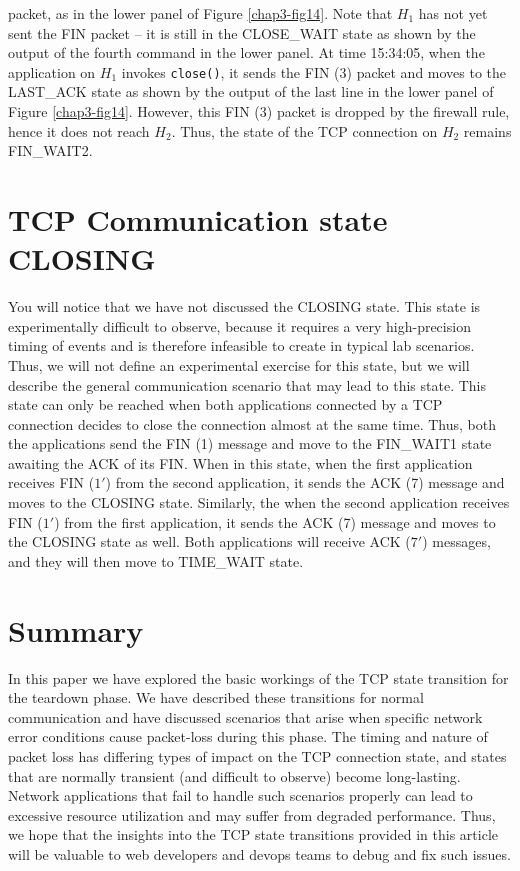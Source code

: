 \begin{multicols}{2}
\noindent
packet, as in the lower panel of Figure \ref{chap3-fig14}. Note that $H_{1}$ has not yet sent the FIN packet -- it is still in the CLOSE\_WAIT state as shown by the output of the fourth command in the lower panel. At time 15:34:05, when the application on $H_{1}$ invokes \lstinline|close()|, it sends the FIN (3) packet and moves to the LAST\_ACK state as shown by the output of the last line in the lower panel of Figure \ref{chap3-fig14}. However, this FIN (3) packet is dropped by the firewall rule, hence it does not reach $H_{2}$. Thus, the state of the TCP connection on $H_{2}$ remains FIN\_WAIT2.


\section*{TCP Communication state CLOSING}

You will notice that we have not discussed the CLOSING state. This state is experimentally difficult to observe, because it requires a very high-precision timing of events and is therefore infeasible to create in typical lab scenarios. Thus, we will not define an experimental exercise for this state, but we will describe the general communication scenario that may lead to this state. This state can only be reached when both applications connected by a TCP connection decides to close the connection almost at the same time. Thus, both the applications send the FIN (1) message and move to the FIN\_WAIT1 state awaiting the ACK of its FIN. When in this state, when the first application receives FIN ($1'$) from the second application, it sends the ACK (7) message and moves to the CLOSING state. Similarly, the when the second application receives FIN ($1'$) from the first application, it sends the ACK (7) message and moves to the CLOSING state as well. Both applications will receive ACK ($7'$) messages, and they will then move to TIME\_WAIT state.

\section*{Summary}

In this paper we have explored the basic workings of the TCP state transition for the teardown phase. We have described these transitions for normal communication and have discussed scenarios that arise when specific network error conditions cause packet-loss during this phase. The timing and nature of packet loss has differing types of impact on the TCP connection state, and states that are normally transient (and difficult to observe) become long-lasting. Network applications that fail to handle such scenarios properly can lead to excessive resource utilization and may suffer from degraded performance. Thus, we hope that the insights into the TCP state transitions provided in this article will be valuable to web developers and devops teams to debug and fix such issues.


\end{multicols}
